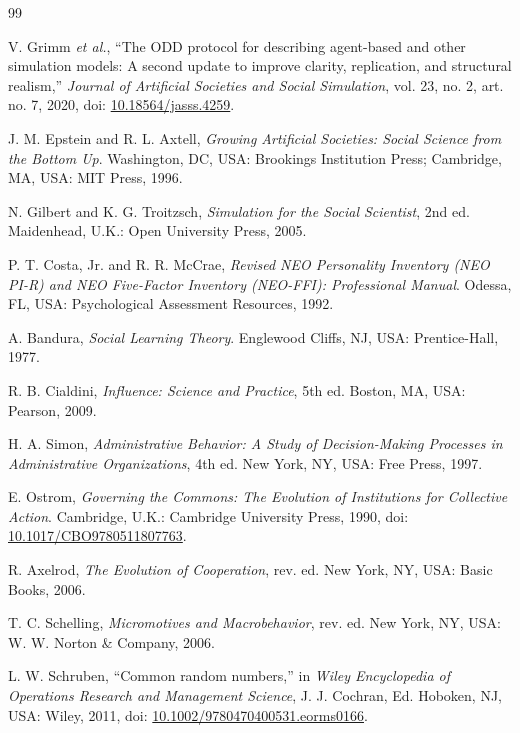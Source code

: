 \documentclass[11pt,a4paper]{article}
\begin{document}
\clearpage
\begin{thebibliography}{99}

V. Grimm \emph{et al.}, ``The ODD protocol for describing agent-based and other
simulation models: A second update to improve clarity, replication, and
structural realism,'' \emph{Journal of Artificial Societies and Social
Simulation}, vol. 23, no. 2, art. no. 7, 2020,
doi: \href{https://doi.org/10.18564/jasss.4259}{10.18564/jasss.4259}.

J. M. Epstein and R. L. Axtell, \emph{Growing Artificial Societies: Social
Science from the Bottom Up}. Washington, DC, USA: Brookings Institution Press;
Cambridge, MA, USA: MIT Press, 1996.

N. Gilbert and K. G. Troitzsch, \emph{Simulation for the Social Scientist},
2nd ed. Maidenhead, U.K.: Open University Press, 2005.

P. T. Costa, Jr. and R. R. McCrae, \emph{Revised NEO Personality Inventory
(NEO PI-R) and NEO Five-Factor Inventory (NEO-FFI): Professional Manual}.
Odessa, FL, USA: Psychological Assessment Resources, 1992.

A. Bandura, \emph{Social Learning Theory}. Englewood Cliffs, NJ, USA:
Prentice-Hall, 1977.

R. B. Cialdini, \emph{Influence: Science and Practice}, 5th ed. Boston, MA,
USA: Pearson, 2009.

H. A. Simon, \emph{Administrative Behavior: A Study of Decision-Making
Processes in Administrative Organizations}, 4th ed. New York, NY, USA:
Free Press, 1997.

E. Ostrom, \emph{Governing the Commons: The Evolution of Institutions for
Collective Action}. Cambridge, U.K.: Cambridge University Press, 1990,
doi: \href{https://doi.org/10.1017/CBO9780511807763}
{10.1017/CBO9780511807763}.

R. Axelrod, \emph{The Evolution of Cooperation}, rev. ed. New York, NY, USA:
Basic Books, 2006.

T. C. Schelling, \emph{Micromotives and Macrobehavior}, rev. ed. New York,
NY, USA: W. W. Norton \& Company, 2006.

L. W. Schruben, ``Common random numbers,'' in \emph{Wiley Encyclopedia of
Operations Research and Management Science}, J. J. Cochran, Ed. Hoboken, NJ,
USA: Wiley, 2011, doi:
\href{https://doi.org/10.1002/9780470400531.eorms0166}
{10.1002/9780470400531.eorms0166}.

\end{thebibliography}
\end{document}
